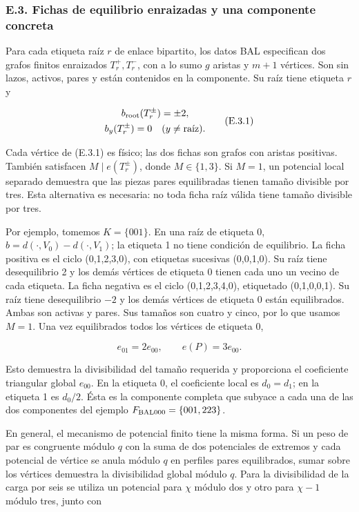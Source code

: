 \documentclass[spanish,11pt,a4paper]{article}
\begin{document}
\subsubsection{E.3. Fichas de equilibrio enraizadas y una componente concreta}\label{e.3.-fichas-de-equilibrio-enraizadas-y-una-componente-concreta}

Para cada etiqueta raíz \(r\) de enlace bipartito, los datos BAL especifican dos grafos finitos enraizados \(T_r^+,T_r^-\), con a lo sumo \(g\) aristas y \(m+1\) vértices. Son sin lazos, activos, pares y están contenidos en la componente. Su raíz tiene etiqueta \(r\) y

\[\begin{gathered}
b_{\rm root}(T_r^\pm)=\pm2,\\
b_y(T_r^\pm)=0\quad(y\ne\text{raíz}).
\end{gathered}
\tag{E.3.1}\]

Cada vértice de (E.3.1) es físico; las dos fichas son grafos con aristas positivas. También satisfacen \(M\mid e(T_r^\pm)\), donde \(M\in\{1,3\}\). Si \(M=1\), un potencial local separado demuestra que las piezas pares equilibradas tienen tamaño divisible por tres. Esta alternativa es necesaria: no toda ficha raíz válida tiene tamaño divisible por tres.

Por ejemplo, tomemos \(K=\{001\}\). En una raíz de etiqueta 0, \(b=d(\cdot,V_0)-d(\cdot,V_1)\); la etiqueta 1 no tiene condición de equilibrio. La ficha positiva es el ciclo (0,1,2,3,0), con etiquetas sucesivas (0,0,1,0). Su raíz tiene desequilibrio 2 y los demás vértices de etiqueta 0 tienen cada uno un vecino de cada etiqueta. La ficha negativa es el ciclo (0,1,2,3,4,0), etiquetado (0,1,0,0,1). Su raíz tiene desequilibrio \(-2\) y los demás vértices de etiqueta 0 están equilibrados. Ambas son activas y pares. Sus tamaños son cuatro y cinco, por lo que usamos \(M=1\). Una vez equilibrados todos los vértices de etiqueta 0,

\[e_{01}=2e_{00},\qquad e(P)=3e_{00}.
\tag{E.3.2}\]

Esto demuestra la divisibilidad del tamaño requerida y proporciona el coeficiente triangular global \(e_{00}\). En la etiqueta 0, el coeficiente local es \(d_0=d_1\); en la etiqueta 1 es \(d_0/2\). Ésta es la componente completa que subyace a cada una de las dos componentes del ejemplo \(F_{\rm BAL000}=\{001,223\}\).

En general, el mecanismo de potencial finito tiene la misma forma. Si un peso de par es congruente módulo \(q\) con la suma de dos potenciales de extremos y cada potencial de vértice se anula módulo \(q\) en perfiles pares equilibrados, sumar sobre los vértices demuestra la divisibilidad global módulo \(q\). Para la divisibilidad de la carga por seis se utiliza un potencial para \(\chi\) módulo dos y otro para \(\chi-1\) módulo tres, junto con
\end{document}
